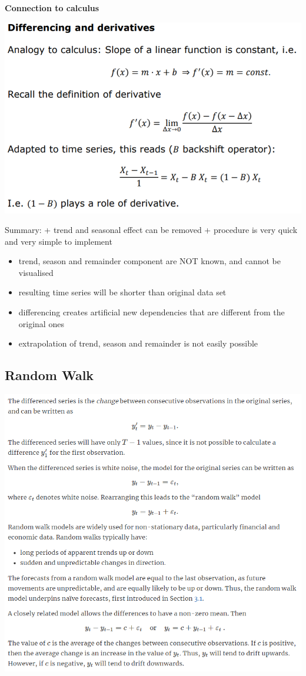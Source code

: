 \documentclass[
]{article}
\providecommand{\tightlist}{%
  \setlength{\itemsep}{0pt}\setlength{\parskip}{0pt}}
\begin{document}
\textbf{Connection to calculus}

\includegraphics[width=1\linewidth]{derivative}

Summary: + trend and seasonal effect can be removed + procedure is very
quick and very simple to implement

\begin{itemize}
\tightlist
\item
  trend, season and remainder component are NOT known, and cannot be
  visualised
\item
  resulting time series will be shorter than original data set
\item
  differencing creates artificial new dependencies that are different
  from the original ones
\item
  extrapolation of trend, season and remainder is not easily possible
\end{itemize}

\hypertarget{random-walk}{%
\subsection{Random Walk}\label{random-walk}}

\includegraphics[width=1\linewidth]{random_walk}
\end{document}
